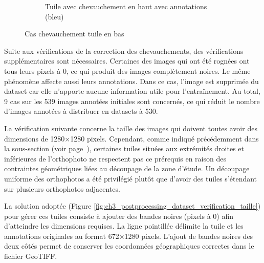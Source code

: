 \begin{figure}[H]
\begin{subfigure}[b]{0.49\textwidth}
        \caption{Tuile avec chevauchement en haut avec annotations (bleu)}
        \label{fig:ch3_postprocessing_dataset_15_validation_chevauchement_bas4}
    \end{subfigure}
    
    \caption{Cas chevauchement tuile en bas}
    \label{fig:exemple_post_traitement_validation_tuile_bas}
\end{figure}

Suite aux vérifications de la correction des chevauchements, des vérifications supplémentaires sont nécessaires. Certaines des images qui ont été rognées ont tous leurs pixels à 0, ce qui produit des images complètement noires. Le même phénomène affecte aussi leurs annotations. Dans ce cas, l'image est supprimée du dataset car elle n'apporte aucune information utile pour l'entraînement. Au total, 9 cas sur les 539 images annotées initiales sont concernés, ce qui réduit le nombre d'images annotées à distribuer en datasets à 530.

La vérification suivante concerne la taille des images qui doivent toutes avoir des dimensions de 1280×1280 pixels. Cependant, comme indiqué précédemment dans la sous-section \textit{} (voir page~\pageref{subsubsec:decoupe_orthophoto_tuile}), certaines tuiles situées aux extrémités droites et inférieures de l'orthophoto ne respectent pas ce prérequis en raison des contraintes géométriques liées au découpage de la zone d'étude. Un découpage uniforme des orthophotos a été privilégié plutôt que d'avoir des tuiles s'étendant sur plusieurs orthophotos adjacentes.

La solution adoptée (Figure \ref{fig:ch3_postprocessing_dataset_verification_taille}) pour gérer ces tuiles consiste à ajouter des bandes noires (pixels à 0) afin d'atteindre les dimensions requises. La ligne pointillée délimite la tuile et les annotations originales au format 672×1280 pixels. L'ajout de bandes noires des deux côtés permet de conserver les coordonnées géographiques correctes dans le fichier GeoTIFF.

